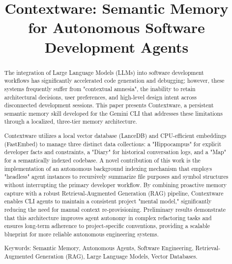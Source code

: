 \documentclass[conference]{IEEEtran}
\begin{document}
\title{Contextware: Semantic Memory for Autonomous Software Development Agents}

\author{
\and
{}
}

\maketitle

\begin{abstract}
The integration of Large Language Models (LLMs) into software development workflows has significantly accelerated code generation and debugging; however, these systems frequently suffer from "contextual amnesia", the inability to retain architectural decisions, user preferences, and high-level design intent across disconnected development sessions. This paper presents Contextware, a persistent semantic memory skill developed for the Gemini CLI that addresses these limitations through a localized, three-tier memory architecture.

Contextware utilizes a local vector database (LanceDB) and CPU-efficient embeddings (FastEmbed) to manage three distinct data collections: a "Hippocampus" for explicit developer facts and constraints, a "Diary" for historical conversation logs, and a "Map" for a semantically indexed codebase. A novel contribution of this work is the implementation of an autonomous background indexing mechanism that employs "headless" agent instances to recursively summarize file purposes and symbol structures without interrupting the primary developer workflow. By combining proactive memory capture with a robust Retrieval-Augmented Generation (RAG) pipeline, Contextware enables CLI agents to maintain a consistent project "mental model," significantly reducing the need for manual context re-provisioning. Preliminary results demonstrate that this architecture improves agent autonomy in complex refactoring tasks and ensures long-term adherence to project-specific conventions, providing a scalable blueprint for more reliable autonomous engineering systems.


Keywords: Semantic Memory, Autonomous Agents, Software Engineering, Retrieval-Augmented Generation (RAG), Large Language Models, Vector Databases.
\end{abstract}
\end{document}
